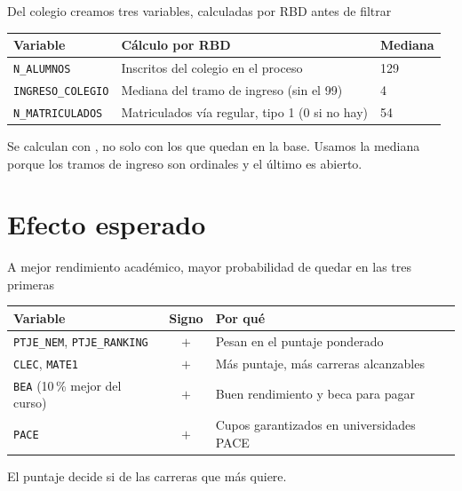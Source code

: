 \begin{frame}{Del colegio creamos tres variables, calculadas por RBD antes de filtrar}
  \begin{center}
  \begin{tabular}{lll}
    \toprule
    \textbf{Variable} & \textbf{Cálculo por RBD} & \textbf{Mediana} \\
    \midrule
    \texttt{N\_ALUMNOS} & Inscritos del colegio en el proceso & 129 \\
    \texttt{INGRESO\_COLEGIO} & Mediana del tramo de ingreso (sin el 99) & 4 \\
    \texttt{N\_MATRICULADOS} & Matriculados vía regular, tipo 1 (0 si no hay) & 54 \\
    \bottomrule
  \end{tabular}
  \end{center}
  \medskip
  Se calculan con , no solo con los
  que quedan en la base. Usamos la mediana porque los tramos de ingreso son
  ordinales y el último es abierto.
\end{frame}

\section{Efecto esperado}

\begin{frame}{A mejor rendimiento académico, mayor probabilidad de quedar en las tres primeras}
  \begin{center}
  \begin{tabular}{lcl}
    \toprule
    \textbf{Variable} & \textbf{Signo} & \textbf{Por qué} \\
    \midrule
    \texttt{PTJE\_NEM}, \texttt{PTJE\_RANKING} & $+$ & Pesan en el puntaje ponderado \\
    \texttt{CLEC}, \texttt{MATE1} & $+$ & Más puntaje, más carreras alcanzables \\
    \texttt{BEA} (10\,\% mejor del curso) & $+$ & Buen rendimiento y beca para pagar \\
    \texttt{PACE} & $+$ & Cupos garantizados en universidades PACE \\
    \bottomrule
  \end{tabular}
  \end{center}
  \medskip
  El puntaje decide si  de las carreras que más
  quiere.
\end{frame}

